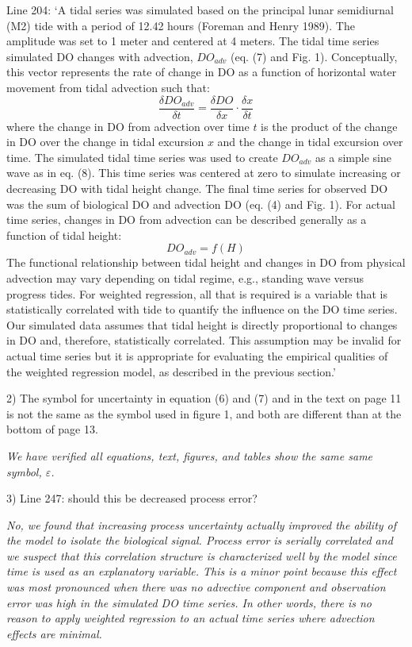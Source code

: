 \documentclass[letterpaper,12pt]{article}\usepackage[]{graphicx}\usepackage[]{color}
\begin{document}
{Line 204: `A tidal series was simulated based on the principal lunar semidiurnal (M2) tide with a period of 12.42 hours (Foreman and Henry 1989).  The amplitude was set to 1 meter and centered  at 4 meters.  The tidal time series simulated DO changes with advection, $DO_{adv}$ (eq. (7) and Fig. 1). Conceptually, this vector represents the rate of change in DO as a function of horizontal water movement from tidal advection such that:
\begin{equation} \tag{10}
\frac{\delta DO_{adv}}{\delta t} = \frac{\delta DO}{\delta x} \cdot \frac{\delta x}{\delta t}
\end{equation}
where the change in DO from advection over time $t$ is the product of the change in DO over the change in tidal excursion $x$ and the change in tidal excursion over time.  The simulated tidal time series was used to create $DO_{adv}$ as a simple sine wave as in eq. (8).  This time series was centered at zero to simulate increasing or decreasing DO with tidal height change.  The final time series for observed DO was the sum of biological DO and advection DO (eq. (4) and Fig. 1).  For actual time series, changes in DO from advection can be described generally as a function of tidal height:
\begin{equation} \tag{11}
DO_{adv} = f\left(H\right) 
\end{equation}
The functional relationship between tidal height and changes in DO from physical advection may vary depending on tidal regime, e.g., standing wave versus progress tides.  For weighted regression, all that is required is a variable that is statistically correlated with tide to quantify the influence on the DO time series.  Our simulated data assumes that tidal height is directly proportional to changes in DO and, therefore, statistically correlated.  This assumption may be invalid for actual time series but it is appropriate for evaluating the empirical qualities of the weighted regression model, as described in the previous section.'  

}

2) The symbol for uncertainty in equation (6) and (7) and in the text on page 11 is not the same as the symbol used in figure 1, and both are different than at the bottom of page 13.

{\it We have verified all equations, text, figures, and tables show the same same symbol, $\varepsilon$.}

3) Line 247: should this be decreased process error?

{\it No, we found that increasing process uncertainty actually improved the ability of the model to isolate the biological signal.  Process error is serially correlated and we suspect that this correlation structure is characterized well by the model since time is used as an explanatory variable.  This is a minor point because this effect was most pronounced when there was no advective component and observation error was high in the simulated DO time series.  In other words, there is no reason to apply weighted regression to an actual time series where advection effects are minimal.}
\end{document}
